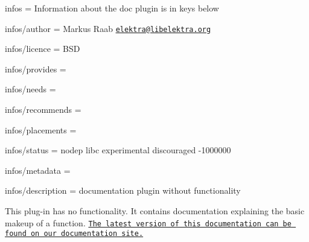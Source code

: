 
\begin{DoxyItemize}
\item infos = Information about the doc plugin is in keys below
\item infos/author = Markus Raab \href{mailto:elektra@libelektra.org}{\tt elektra@libelektra.\+org}
\item infos/licence = B\+SD
\item infos/provides =
\item infos/needs =
\item infos/recommends =
\item infos/placements =
\item infos/status = nodep libc experimental discouraged -\/1000000
\item infos/metadata =
\item infos/description = documentation plugin without functionality
\end{DoxyItemize}

This plug-\/in has no functionality. It contains documentation explaining the basic makeup of a function. \href{https://doc.libelektra.org/api/latest/html/group__plugin.html}{\tt The latest version of this documentation can be found on our documentation site.} 